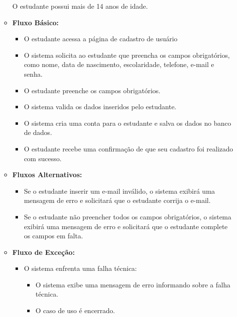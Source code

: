 \begin{itemize}
\begin{itemize}
        O estudante possui mais de 14 anos de idade.
        \item \textbf{Fluxo Básico:}
        \begin{itemize}
            \item O estudante acessa a página de cadastro de usuário
            \item O sistema solicita ao estudante que preencha os campos obrigatórios, como nome, data de nascimento, escolaridade, telefone, e-mail e senha.
            \item O estudante preenche os campos obrigatórios.
            \item O sistema valida os dados inseridos pelo estudante.
            \item O sistema cria uma conta para o estudante e salva os dados no banco de dados.
            \item O estudante recebe uma confirmação de que seu cadastro foi realizado com sucesso.
        \end{itemize}
        \item  \textbf{Fluxos Alternativos:}
        \begin{itemize}
            \item Se o estudante inserir um e-mail inválido, o sistema exibirá uma mensagem de erro e solicitará que o estudante corrija o e-mail.
            \item Se o estudante não preencher todos os campos obrigatórios, o sistema exibirá uma mensagem de erro e solicitará que o estudante complete os campos em falta.
        \end{itemize}
        \item \textbf{Fluxo de Exceção:}
        \begin{itemize}
            \item O sistema enfrenta uma falha técnica:
            \begin{itemize}
                \item O sistema exibe uma mensagem de erro informando sobre a falha técnica.
                \item O caso de uso é encerrado.
            \end{itemize}
        \end{itemize}
    \end{itemize}
\end{itemize}
